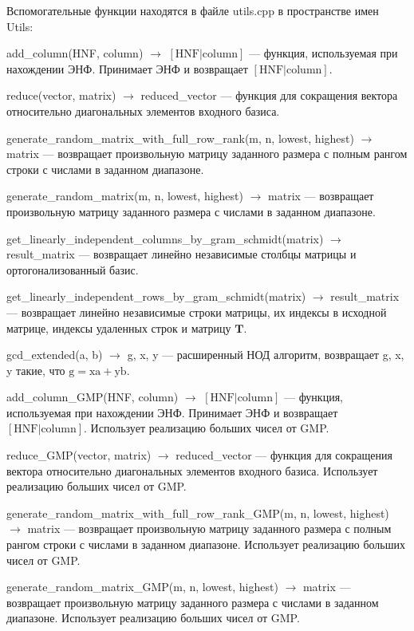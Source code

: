 Вспомогательные функции находятся в файле utils.cpp в пространстве имен Utils:

add\_column(HNF, column) $ \rightarrow $ $ \left[\text{HNF} | \text{column}\right] $ --- функция, используемая при нахождении ЭНФ. Принимает ЭНФ и возвращает $ \left[\text{HNF} | \text{column}\right] $.

reduce(vector, matrix) $ \rightarrow $ reduced\_vector --- функция для сокращения вектора относительно диагональных элементов входного базиса.

generate\_random\_matrix\_with\_full\_row\_rank(m, n, lowest, highest) $ \rightarrow $ matrix --- возвращает произвольную матрицу заданного размера с полным рангом строки с числами в заданном диапазоне.

generate\_random\_matrix(m, n, lowest, highest) $ \rightarrow $ matrix --- возвращает произвольную матрицу заданного размера с числами в заданном диапазоне.

get\_linearly\_independent\_columns\_by\_gram\_schmidt(matrix) $ \rightarrow $ result\_matrix --- возвращает линейно независимые столбцы матрицы и ортогонализованный базис.

get\_linearly\_independent\_rows\_by\_gram\_schmidt(matrix) $ \rightarrow $ result\_matrix --- возвращает линейно независимые строки матрицы, их индексы в исходной матрице, индексы удаленных строк и матрицу $ \mathbf{T} $.

gcd\_extended(a, b) $ \rightarrow $ g, x, y --- расширенный НОД алгоритм, возвращает g, x, y такие, что $ \mathrm{g} = \mathrm{xa} + \mathrm{yb} $.

add\_column\_GMP(HNF, column) $ \rightarrow $ $ \left[\text{HNF} | \text{column}\right] $ --- функция, используемая при нахождении ЭНФ. Принимает ЭНФ и возвращает $ \left[\text{HNF} | \text{column}\right] $. Использует реализацию больших чисел от GMP.

reduce\_GMP(vector, matrix) $ \rightarrow $ reduced\_vector --- функция для сокращения вектора относительно диагональных элементов входного базиса. Использует реализацию больших чисел от GMP.

generate\_random\_matrix\_with\_full\_row\_rank\_GMP(m, n, lowest, highest) $ \rightarrow $ matrix --- возвращает произвольную матрицу заданного размера с полным рангом строки с числами в заданном диапазоне. Использует реализацию больших чисел от GMP.

generate\_random\_matrix\_GMP(m, n, lowest, highest) $ \rightarrow $ matrix --- возвращает произвольную матрицу заданного размера с числами в заданном диапазоне. Использует реализацию больших чисел от GMP.

